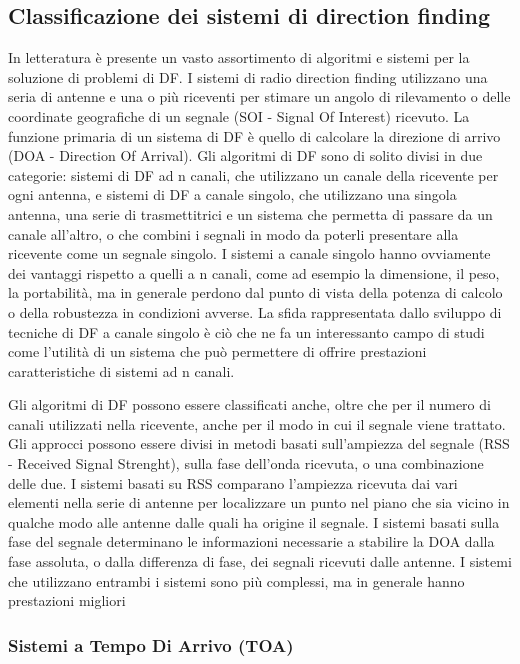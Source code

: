 \subsection{Classificazione dei sistemi di direction finding}

In letteratura è presente un vasto assortimento di algoritmi e sistemi per la soluzione di problemi di DF.
I sistemi di radio direction finding utilizzano una seria di antenne e una o più riceventi per stimare un angolo di rilevamento o delle coordinate geografiche di un segnale (SOI - Signal Of Interest) ricevuto. La funzione primaria di un sistema di DF è quello di calcolare la direzione di arrivo (DOA - Direction Of Arrival). 
Gli algoritmi di DF sono di solito divisi in due categorie: sistemi di DF ad n canali, che utilizzano un canale della ricevente per ogni antenna, e sistemi di DF a canale singolo, che utilizzano una singola antenna, una serie di trasmettitrici e un sistema che permetta di passare da un canale all'altro, o che combini i segnali in modo da poterli presentare alla ricevente come un segnale singolo. I sistemi a canale singolo hanno ovviamente dei vantaggi rispetto a quelli a n canali, come ad esempio la dimensione, il peso, la portabilità, ma in generale perdono dal punto di vista della potenza di calcolo o della robustezza in condizioni avverse. La sfida rappresentata dallo sviluppo di tecniche di DF a canale singolo è ciò che ne fa un interessanto campo di studi come l'utilità di un sistema che può permettere di offrire prestazioni caratteristiche di sistemi ad n canali.

Gli algoritmi di DF possono essere classificati anche, oltre che per il numero di canali utilizzati nella ricevente, anche per il modo in cui il segnale viene trattato. Gli approcci possono essere divisi in metodi basati sull'ampiezza del segnale (RSS - Received Signal Strenght), sulla fase	dell'onda ricevuta, o una combinazione delle due. I sistemi basati su RSS comparano l'ampiezza ricevuta dai vari elementi nella serie di antenne per localizzare un punto nel piano che sia vicino in qualche modo alle antenne dalle quali ha origine il segnale. I sistemi basati sulla fase del segnale determinano le informazioni necessarie a stabilire la DOA dalla fase assoluta, o dalla differenza di fase, dei segnali ricevuti dalle antenne. I sistemi che utilizzano entrambi i sistemi sono più complessi, ma in generale hanno prestazioni migliori

\subsubsection{Sistemi a Tempo Di Arrivo (TOA)}

